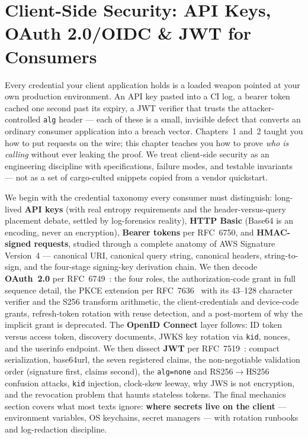 \chapter{Client-Side Security: API Keys, OAuth 2.0/OIDC \& JWT for Consumers}
\label{ch:client_security}

Every credential your client application holds is a loaded weapon pointed at
your own production environment. An API key pasted into a CI log, a bearer
token cached one second past its expiry, a JWT verifier that trusts the
attacker-controlled \texttt{alg} header --- each of these is a small,
invisible defect that converts an ordinary consumer application into a breach
vector. Chapters~1 and~2 taught you how to put requests on the wire; this
chapter teaches you how to prove \emph{who is calling} without ever leaking
the proof. We treat client-side security as an engineering discipline with
specifications, failure modes, and testable invariants --- not as a set of
cargo-culted snippets copied from a vendor quickstart.

We begin with the credential taxonomy every consumer must distinguish:
long-lived \textbf{API keys} (with real entropy requirements and the
header-versus-query placement debate, settled by log-forensics reality),
\textbf{HTTP Basic} (Base64 is an encoding, never an encryption),
\textbf{Bearer tokens} per RFC~6750, and \textbf{HMAC-signed requests},
studied through a complete anatomy of AWS Signature Version~4 --- canonical
URI, canonical query string, canonical headers, string-to-sign, and the
four-stage signing-key derivation chain. We then decode \textbf{OAuth~2.0}
per RFC~6749~\cite{rfc6749}: the four roles, the authorization-code grant in
full sequence detail, the PKCE extension per RFC~7636~\cite{rfc7636} with its
43--128 character verifier and the S256 transform arithmetic, the
client-credentials and device-code grants, refresh-token rotation with reuse
detection, and a post-mortem of why the implicit grant is deprecated. The
\textbf{OpenID Connect} layer follows: ID token versus access token,
discovery documents, JWKS key rotation via \texttt{kid}, nonces, and the
userinfo endpoint. We then dissect \textbf{JWT} per
RFC~7519~\cite{rfc7519}: compact serialization, base64url, the seven
registered claims, the non-negotiable validation order (signature first,
claims second), the \texttt{alg=none} and RS256$\rightarrow$HS256 confusion
attacks, \texttt{kid} injection, clock-skew leeway, why JWS is not
encryption, and the revocation problem that haunts stateless tokens. The
final mechanics section covers what most texts ignore: \textbf{where secrets
live on the client} --- environment variables, OS keychains, secret managers
--- with rotation runbooks and log-redaction discipline.

